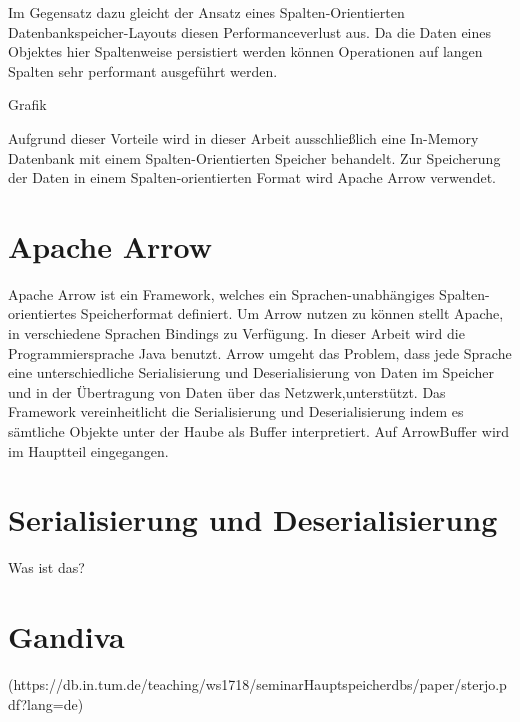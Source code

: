 Im Gegensatz dazu gleicht der Ansatz eines Spalten-Orientierten Datenbankspeicher-Layouts diesen Performanceverlust aus. 
Da die Daten eines Objektes hier Spaltenweise persistiert werden können Operationen auf langen Spalten sehr performant ausgeführt werden.

Grafik

Aufgrund dieser Vorteile wird in dieser Arbeit ausschließlich eine In-Memory Datenbank mit einem Spalten-Orientierten Speicher behandelt.
Zur Speicherung der Daten in einem Spalten-orientierten Format wird Apache Arrow verwendet.

\section{Apache Arrow}

Apache Arrow ist ein Framework, welches ein Sprachen-unabhängiges Spalten-orientiertes Speicherformat definiert. 
Um Arrow nutzen zu können stellt Apache, in verschiedene Sprachen Bindings zu Verfügung. In dieser Arbeit wird die Programmiersprache Java benutzt.
Arrow umgeht das Problem, dass jede Sprache eine unterschiedliche Serialisierung und Deserialisierung von Daten im Speicher und in der Übertragung von Daten über das Netzwerk,unterstützt.
Das Framework vereinheitlicht die Serialisierung und Deserialisierung indem es sämtliche Objekte unter der Haube als Buffer interpretiert.
Auf ArrowBuffer wird im Hauptteil eingegangen.


\section{Serialisierung und Deserialisierung}

Was ist das?

\section{Gandiva}


 



(https://db.in.tum.de/teaching/ws1718/seminarHauptspeicherdbs/paper/sterjo.pdf?lang=de)